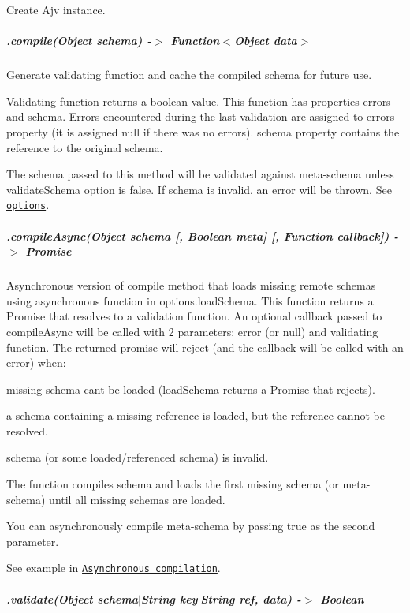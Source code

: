 Create Ajv instance.

\subparagraph*{.compile(\+Object schema) -\/$>$ Function$<$Object data$>$}

Generate validating function and cache the compiled schema for future use.

Validating function returns a boolean value. This function has properties {\ttfamily errors} and {\ttfamily schema}. Errors encountered during the last validation are assigned to {\ttfamily errors} property (it is assigned {\ttfamily null} if there was no errors). {\ttfamily schema} property contains the reference to the original schema.

The schema passed to this method will be validated against meta-\/schema unless {\ttfamily validate\+Schema} option is false. If schema is invalid, an error will be thrown. See \href{#options}{\tt options}.

\subparagraph*{\label{_api-compileAsync}%
.compile\+Async(\+Object schema \mbox{[}, Boolean meta\mbox{]} \mbox{[}, Function callback\mbox{]}) -\/$>$ Promise}

Asynchronous version of {\ttfamily compile} method that loads missing remote schemas using asynchronous function in {\ttfamily options.\+load\+Schema}. This function returns a Promise that resolves to a validation function. An optional callback passed to {\ttfamily compile\+Async} will be called with 2 parameters\+: error (or null) and validating function. The returned promise will reject (and the callback will be called with an error) when\+:


\begin{DoxyItemize}
\item missing schema can\textquotesingle{}t be loaded ({\ttfamily load\+Schema} returns a Promise that rejects).
\item a schema containing a missing reference is loaded, but the reference cannot be resolved.
\item schema (or some loaded/referenced schema) is invalid.
\end{DoxyItemize}

The function compiles schema and loads the first missing schema (or meta-\/schema) until all missing schemas are loaded.

You can asynchronously compile meta-\/schema by passing {\ttfamily true} as the second parameter.

See example in \href{#asynchronous-schema-compilation}{\tt Asynchronous compilation}.

\subparagraph*{.validate(Object schema$\vert$\+String key$\vert$\+String ref, data) -\/$>$ Boolean}


